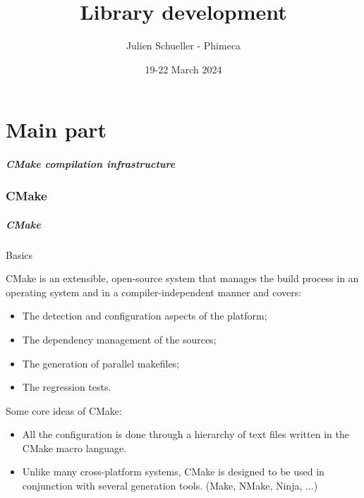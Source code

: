 \documentclass[8pt]{beamer}
\title{Library development}
\author{Julien Schueller - Phimeca}
\date{19-22 March 2024}
\institute{\small OpenTURNS Consortium}
\begin{document}
\frame{\titlepage}

\part{Main part}

\begin{frame}
  \frametitle{CMake compilation infrastructure}
  \tableofcontents[part=1]
\end{frame}

\section[CMake]{CMake}
\begin{frame}
  \frametitle{CMake}
  \begin{block}{Basics}

  CMake is an extensible, open-source system that manages the build process in an operating system and in a compiler-independent manner and covers:
  
\begin{itemize}
  \item The detection and configuration aspects of the platform;

  \item The dependency management of the sources;

  \item The generation of parallel makefiles;

  \item The regression tests.
\end{itemize}

Some core ideas of CMake:
\begin{itemize}
  \item All the configuration is done through a hierarchy of text files written in the CMake macro language.
  
  \item Unlike many cross-platform systems, CMake is designed to be used in conjunction with several generation tools.
  (Make, NMake, Ninja, ...)
\end{itemize}

  \end{block}
\end{frame}
\end{document}
